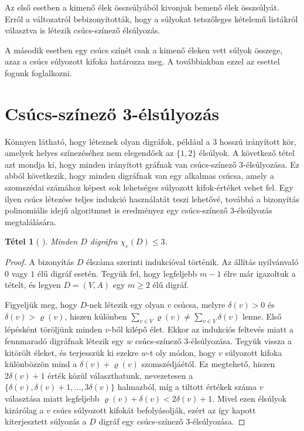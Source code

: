 \documentclass[12pt, a4paper]{report}
\newtheorem{tét}{Tétel}[section]
\theoremstyle{remark}
\theoremstyle{definition}
\begin{document}
Az első esetben a kimenő élek összsúlyából kivonjuk bemenő élek összsúlyát. Erről a változatról \citeauthor{Bartnicki2009} \cite{Bartnicki2009} bebizonyították, hogy a súlyokat tetszőleges kételemű listákról választva is létezik csúcs-színező élsúlyozás.

A második esetben egy csúcs színét csak a kimenő éleken vett súlyok összege, azaz a csúcs súlyozott kifoka határozza meg. A továbbiakban ezzel az esettel fogunk foglalkozni.

\section{Csúcs-színező 3-élsúlyozás}
Könnyen látható, hogy léteznek olyan digráfok, például a $3$ hosszú irányított kör, amelyek helyes színezéséhez nem elegendőek az $\lbrace 1, 2 \rbrace$ élsúlyok. A következő tétel azt mondja ki, hogy minden irányított gráfnak van csúcs-színező 3-élsúlyozása. Ez abból következik, hogy minden digráfnak van egy alkalmas csúcsa, amely a szomszédai számához képest sok lehetséges súlyozott kifok-értéket vehet fel. Egy ilyen csúcs létezése teljes indukció használatát teszi lehetővé, továbbá a bizonyítás polinomiális idejű algoritmust is eredményez egy csúcs-színező 3-élsúlyozás megtalálására.

\begin{tét}[\citeauthor{Baudon2014} \cite{Baudon2014}]
Minden $D$ digráfra $\chi_e(D) \leq 3$.
\end{tét}

\begin{proof}
A bizonyítás $D$ élszáma szerinti indukcióval történik. Az állítás nyilvánvaló $0$ vagy $1$ élű digráf esetén. Tegyük fel, hogy legfeljebb $m - 1$ élre már igazoltuk a tételt, és legyen $D = (V, A)$ egy $m \geq 2$ élű digráf.

Figyeljük meg, hogy $D$-nek létezik egy olyan $v$ csúcsa, melyre $\delta(v) > 0$ és $\delta(v) > \varrho(v)$, hiszen különben $\sum\limits_{v \in V} \varrho(v) \neq \sum\limits_{v \in V} \delta(v)$ lenne. Első lépésként töröljünk minden $v$-ből kilépő élet. Ekkor az indukciós feltevés miatt a fennmaradó digráfnak létezik egy $w$ csúcs-színező 3-élsúlyozása. Tegyük vissza a kitörölt éleket, és terjesszük ki ezekre $w$-t oly módon, hogy $v$ súlyozott kifoka különbözzön mind a $\delta(v) + \varrho(v)$ szomszédjáétól. Ez megtehető, hiszen $2\delta(v) + 1$ érték közül választhatunk, nevezetesen a $\lbrace \delta(v), \delta(v) + 1, \ldots, 3\delta(v) \rbrace$ halmazból, míg a tiltott értékek száma $v$ választása miatt legfeljebb $\varrho(v) + \delta(v) < 2\delta(v) + 1$. Mivel ezen élsúlyok kizárólag a $v$ csúcs súlyozott kifokát befolyásolják, ezért az így kapott kiterjesztett súlyozás a $D$ digráf egy csúcs-színező 3-élsúlyozása.
\end{proof}
\end{document}
